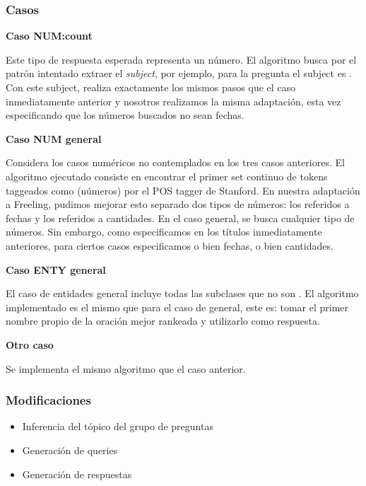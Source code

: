 \begin{frame}
\frametitle{Casos}


\textbf{Caso NUM:count} \newline

Este tipo de respuesta esperada representa un número. El algoritmo busca por el patrón  intentado extraer el \textit{subject}, por ejemplo, para la pregunta  el subject es . Con este subject, realiza exactamente los mismos pasos que el caso inmediatamente anterior y nosotros realizamos la misma adaptación, esta vez especificando que los números buscados no sean fechas. \newline


\textbf{Caso NUM general} \newline

Considera los casos numéricos no contemplados en los tres casos anteriores. El algoritmo ejecutado consiste en encontrar el primer set continuo de tokens taggeados como  (números) por el POS tagger de Stanford. En nuestra adaptación a Freeling, pudimos mejorar esto separado dos tipos de números: los referidos a fechas y los referidos a cantidades. En el caso general, se busca cualquier tipo de números. Sin embargo, como especificamos en los títulos inmediatamente anteriores, para ciertos casos especificamos o bien fechas, o bien cantidades. \newline

\textbf{Caso ENTY general} \newline

El caso de entidades general incluye todas las subclases que no son . El algoritmo implementado es el mismo que para el caso de  general, este es: tomar el primer nombre propio de la oración mejor rankeada y utilizarlo como respuesta. \newline

\textbf{Otro caso} \newline

Se implementa el mismo algoritmo que el caso anterior. \newline


\end{frame}

\begin{frame}
\frametitle{Modificaciones}
  \begin{itemize}
    \item Inferencia del tópico del grupo de preguntas
    \item Generación de queries
    \item Generación de respuestas
  \end{itemize}
\end{frame}

